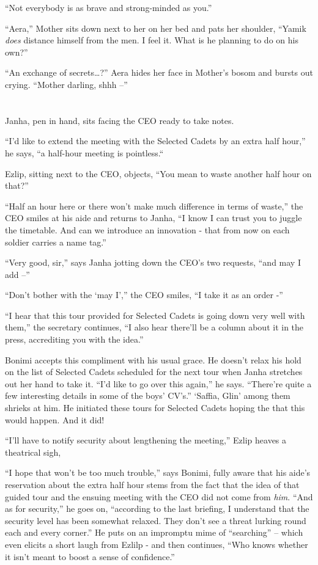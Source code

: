 \documentclass[twoside,11pt]{book}
\begin{document}
``Not everybody is as brave and strong-minded as you.''

``Aera,'' Mother sits down next to her on her bed and pats her shoulder, ``Yamik
\textit{does} distance himself from the men. I feel it. What is he planning to do on his own?''

``An exchange of secrets{\dots}?'' Aera hides her face in Mother's bosom and bursts out
crying. ``Mother darling, shhh --''


\bigskip

\chapter{}

Janha, pen in hand, sits facing the CEO ready to take notes.

``I'd like to extend the meeting with the Selected Cadets by an extra half hour,'' he says,
``a half-hour meeting is pointless.``

Ezlip, sitting next to the CEO, objects, ``You mean to waste another half hour on that?''

``Half an hour here or there won't make much difference in terms of waste,'' the CEO smiles at
his aide and returns to Janha, ``I know I can trust you to juggle the timetable.  And can we introduce an
innovation - that from now on each soldier carries a name tag.''

``Very good, sir,'' says Janha jotting down the CEO's two requests, ``and may I add --''

``Don't bother with the `may I','' the CEO smiles, ``I take it
as an order -''

``I hear that this tour provided for Selected Cadets is going down very well with them,'' the
secretary continues, ``I also hear there'll be a column about it in the press, accrediting you with the
idea.''

Bonimi accepts this compliment with his usual grace. He doesn't relax his hold on the list of Selected
Cadets scheduled for the next tour when Janha stretches out her hand to take it. ``I'd
like to go over this again,'' he says. ``There're quite a few interesting details in some of
the boys' CV's.'' `Saffia, Glin' among them shrieks at him. He initiated these tours for Selected
Cadets hoping the that this would happen. And it did!

``I'll have to notify security about lengthening the meeting,'' Ezlip heaves a theatrical
sigh,

``I hope that won't be too much trouble,'' says Bonimi, fully aware that his aide's
reservation about the extra half hour stems from the fact that the idea of that guided tour and the
ensuing meeting with the CEO did not come from \textit{him}. ``And as for security,'' he
goes on, ``according to the last briefing, I understand that the security level has been somewhat relaxed.
They don't see a threat lurking round each and every corner.'' He puts on an impromptu mime of
``searching'' -- which even elicits a short laugh from Ezlilp - and then continues, ``Who knows whether it
isn't meant to boost a sense of confidence.''
\end{document}
